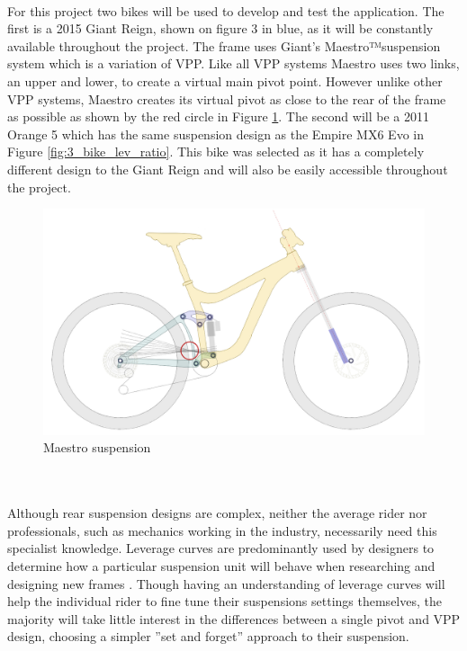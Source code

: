 		\\
		For this project two bikes will be used to develop and test the application. The first is a 2015 Giant Reign, shown on figure 3 in blue, as it will be constantly available throughout the project. The frame uses Giant’s Maestro™suspension system which is a variation of VPP. Like all VPP systems Maestro uses two links, an upper and lower, to create a virtual main pivot point. However unlike other VPP systems, Maestro creates its virtual pivot as close to the rear of the frame as possible as shown by the red circle in Figure \ref{fig:maestro}. The second will be a 2011 Orange 5 which has the same suspension design as the Empire MX6 Evo in Figure \ref{fig:3_bike_lev_ratio}. This bike was selected as it has a completely different design to the Giant Reign and will also be easily accessible throughout the project. 
		\begin{figure}[h!]
			\centering
			\includegraphics[width=12cm]{../images/reignsch.PNG}
			\caption{Maestro suspension}
			\label{fig:maestro}
		\end{figure}
		\\\\
		Although rear suspension designs are complex, neither the average rider nor professionals, such as mechanics working in the industry, necessarily need this specialist knowledge. Leverage curves are predominantly used by designers to determine how a particular suspension unit will behave when researching and designing new frames \citep{creek2016curves}. Though having an understanding of leverage curves will help the individual rider to fine tune their suspensions settings themselves, the majority will take little interest in the differences between a single pivot and VPP design, choosing a simpler ”set and forget” approach to their suspension. 
		\\\\
